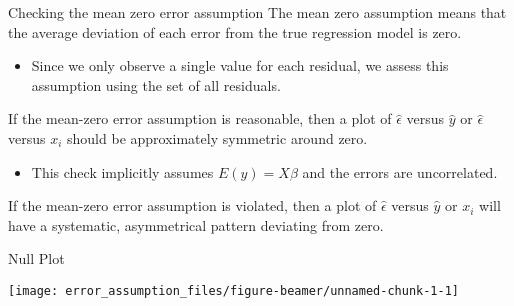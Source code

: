 \begin{frame}{Checking the mean zero error assumption}
\protect\hypertarget{checking-the-mean-zero-error-assumption}{}
The mean zero assumption means that the average deviation of each error
from the true regression model is zero.

\begin{itemize}
\tightlist
\item
  Since we only observe a single value for each residual, we assess this
  assumption using the set of all residuals.
\end{itemize}

If the mean-zero error assumption is reasonable, then a plot of
\(\hat{\epsilon}\) versus \(\hat{y}\) or \(\hat{\epsilon}\) versus
\(x_i\) should be approximately symmetric around zero.

\begin{itemize}
\tightlist
\item
  This check implicitly assumes \(E(y)=X\beta\) and the errors are
  uncorrelated.
\end{itemize}

If the mean-zero error assumption is violated, then a plot of
\(\hat{\epsilon}\) versus \(\hat{y}\) or \(x_i\) will have a systematic,
asymmetrical pattern deviating from zero.
\end{frame}

\begin{frame}{Null Plot}
\protect\hypertarget{null-plot}{}
\begin{center}\texttt{[image: error\_assumption\_files/figure-beamer/unnamed-chunk-1-1]} \end{center}
\end{frame}

